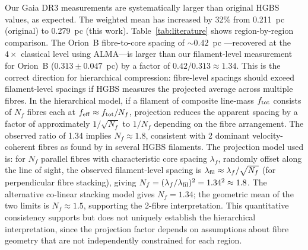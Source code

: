 \documentclass[twoside,twocolumn]{mnras}
\begin{document}
Our Gaia DR3 measurements are systematically larger than original HGBS values, as
expected. The weighted mean has increased by 32\% from 0.211~pc (original) to
0.279~pc (this work). Table~\ref{tab:literature} shows region-by-region comparison.
The Orion~B fibre-to-core spacing of ${\sim}0.42$~pc \citep{Yang2024}---recovered at the
$4\times$ classical level using ALMA---is larger than our filament-level measurement for
Orion~B ($0.313 \pm 0.047$~pc) by a factor of $0.42/0.313 \approx 1.34$. This is the
correct direction for hierarchical compression: fibre-level spacings should exceed
filament-level spacings if HGBS measures the projected average across multiple fibres.
In the hierarchical model, if a filament of composite line-mass $f_{\rm tot}$ consists
of $N_f$ fibres each at $f_{\rm eff} \approx f_{\rm tot}/N_f$, projection reduces the
apparent spacing by a factor of approximately $1/\sqrt{N_f}$ to $1/N_f$ depending on
the fibre arrangement. The observed ratio of 1.34 implies $N_f \approx 1.8$, consistent with 2 dominant velocity-coherent fibres as found by \citet{Hacar2018} in several HGBS filaments. The projection model used is: for $N_f$ parallel fibres with characteristic core spacing $\lambda_f$, randomly offset along the line of sight, the observed filament-level spacing is $\lambda_{\rm fil} \approx \lambda_f / \sqrt{N_f}$ (for perpendicular fibre stacking), giving $N_f = (\lambda_f/\lambda_{\rm fil})^2 = 1.34^2 \approx 1.8$. The alternative co-linear stacking model gives $N_f = 1.34$; the geometric mean of the two limits is $N_f \approx 1.5$, supporting the 2-fibre interpretation. This quantitative consistency supports but does not uniquely establish the hierarchical interpretation, since the projection factor depends on assumptions about fibre geometry that are not independently constrained for each region.
\end{document}

